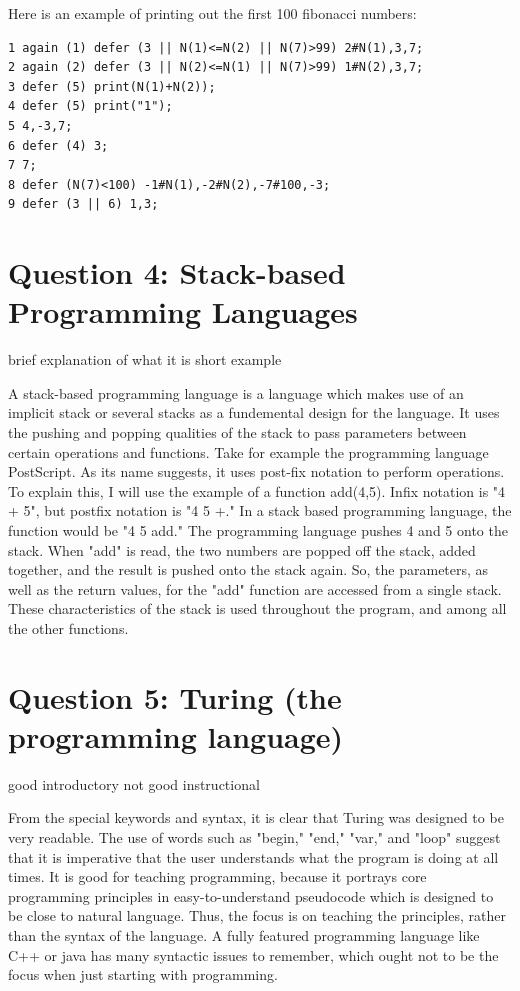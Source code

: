 \documentclass[a4paper]{article}
\begin{document}
	Here is an example of printing out the first 100 fibonacci numbers:
	\begin{lstlisting}
1 again (1) defer (3 || N(1)<=N(2) || N(7)>99) 2#N(1),3,7;
2 again (2) defer (3 || N(2)<=N(1) || N(7)>99) 1#N(2),3,7;
3 defer (5) print(N(1)+N(2));
4 defer (5) print("1");
5 4,-3,7;
6 defer (4) 3;
7 7;
8 defer (N(7)<100) -1#N(1),-2#N(2),-7#100,-3;
9 defer (3 || 6) 1,3; 
	\end{lstlisting}
\section{Question 4: Stack-based Programming Languages}
	brief explanation of what it is
	short example
	
	A stack-based programming language is a language which makes use of an implicit stack or several stacks as a fundemental design for the language. It uses the pushing and popping qualities of the stack to pass parameters between certain operations and functions. 
	Take for example the programming language PostScript. As its name suggests, it uses post-fix notation to perform operations. To explain this, I will use the example of a function add(4,5). Infix notation is "4 + 5", but postfix notation is "4 5 +." In a stack based programming language, the function would be "4 5 add." The programming language pushes 4 and 5 onto the stack. When "add" is read, the two numbers are popped off the stack, added together, and the result is pushed onto the stack again. So, the parameters, as well as the return values, for the "add" function are accessed from a single stack. These characteristics of the stack is used throughout the program, and among all the other functions.
\section{Question 5: Turing (the programming language)}
	good introductory
	not good instructional
	
	From the special keywords and syntax, it is clear that Turing was designed to be very readable. The	use of words such as "begin," "end," "var," and "loop" suggest that it is imperative that the user understands what the program is doing at all times. It is good for teaching programming, because it portrays core programming principles in easy-to-understand pseudocode which is designed to be close to natural language. Thus, the focus is on teaching the principles, rather than the syntax of the language. A fully featured programming language like C++ or java has many syntactic issues to remember, which ought not to be the focus when just starting with programming.
	
\end{document}
